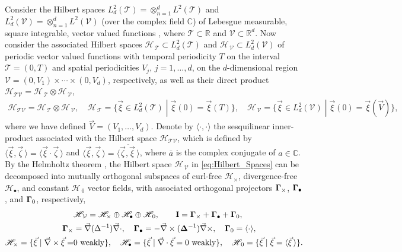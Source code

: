 \documentclass[11pt]{amsart}
\newcommand{\Ib}{\mathbf{I}}
\newcommand{\Tc}{\mathcal{T}}
\newcommand{\Vc}{\mathcal{V}}
\newcommand{\Hs}{\mathscr{H}}
\newcommand\bDelta{\mbox{\boldmath${\Delta}$}}
\newcommand\bGamma{\mbox{\boldmath${\Gamma}$}}
\begin{document}
Consider the Hilbert spaces $L^2_d(\Tc)=\otimes_{n=1}^dL^2(\Tc)$ and
$L^2_d(\Vc)=\otimes_{n=1}^dL^2(\Vc)$ (over the complex field $\mathbb{C}$)
of Lebesgue measurable, square integrable, vector valued functions
\cite{Folland:99}, where $\Tc\subset\mathbb{R}$ and $\Vc\subset\mathbb{R}^d$. Now 
consider the associated Hilbert spaces $\Hs_{\,\Tc}\subset L^2_d(\Tc)$ and
$\Hs_{\,\Vc}\subset L^2_d(\Vc)$ of periodic vector valued functions with
temporal periodicity $T$ on the interval $\Tc=(0,T)$ and spatial
periodicities $V_j$, $j=1,\ldots,d$, on the $d$-dimensional region
$\Vc=(0,V_1)\times\cdots\times(0,V_d)$, respectively, as well as their direct product 
$\Hs_{\Tc\Vc}=\Hs_{\,\Tc}\otimes\Hs_{\,\Vc}$,
%
\begin{align}\label{eq:Hilbert_Spaces}
  \Hs_{\Tc\Vc}=\Hs_{\,\Tc}\otimes\Hs_{\,\Vc}, \quad
  \Hs_{\,\Tc}=\{ 
     \vec{\xi}\in L^2_d(\Tc)\;|\;
     \vec{\xi}(0)=\vec{\xi}(T) 
                        \}, \quad
  \Hs_{\,\Vc}=\{ 
     \vec{\xi}\in L^2_d(\Vc)\;|\;
     \vec{\xi}(0)=\vec{\xi}(\vec{V}) 
                        \}, 
\end{align}
%
where we have defined $\vec{V}=(V_1,\ldots,V_d)$. Denote by $\langle\cdot,\cdot\rangle$ the
sesquilinear inner-product associated with the Hilbert space
$\Hs_{\Tc\Vc}$, which is defined by
$\langle\vec{\xi},\vec{\zeta}\,\rangle=\langle\vec{\xi}\cdot\vec{\zeta}\,\rangle$  and
$\langle\vec{\xi},\vec{\zeta}\,\rangle=\overline{\langle\vec{\zeta},\vec{\xi}\,\rangle}$, where $\bar{a}$ 
is the complex conjugate of $a\in\mathbb{C}$. By the Helmholtz theorem 
\cite{Denaro:2003:0271,Bhatia:IEE:1077}, the 
Hilbert space $\Hs_{\,\Vc}$ in \eqref{eq:Hilbert_Spaces} can be
decomposed into mutually orthogonal subspaces of curl-free $\Hs_\times$,
divergence-free $\Hs_\bullet$, and constant $\Hs_{\,0}$ vector fields, with
associated orthogonal projectors $\bGamma_\times$, $\bGamma_\bullet$, and
$\bGamma_0$, respectively,
\cite{Fannjiang:SIAM_JAM:333,MILTON:2002:TC}    
%
\begin{align}\label{eq:Helmholtz}
  &\Hs_{\,\Vc}=\Hs_\times\oplus\Hs_\bullet\oplus\Hs_{\,0},\qquad
  \Ib=\bGamma_\times+\bGamma_\bullet+\bGamma_0, \\
  \bGamma_\times&=\vec{\nabla}(\Delta^{-1})\vec{\nabla}\cdot, \quad
  \bGamma_\bullet=-\vec{\nabla}\times(\bDelta^{-1})\vec{\nabla}\times, \quad
  \bGamma_0=\langle\cdot\rangle, \quad
  \notag \\
  \Hs_\times=\{\vec{\xi}\;|\;\vec{\nabla}\times\vec{\xi}=&0 \text{ weakly}\}, \quad
  \Hs_\bullet
      =\{\vec{\xi}\;|\;\vec{\nabla}\cdot\vec{\xi}=0 \text{ weakly}\},   \quad
  \Hs_{\,0}
      =\{\vec{\xi}\;|\;\vec{\xi}=\langle\vec{\xi}\,\rangle\}.
     \notag  
\end{align}
%
\end{document}
